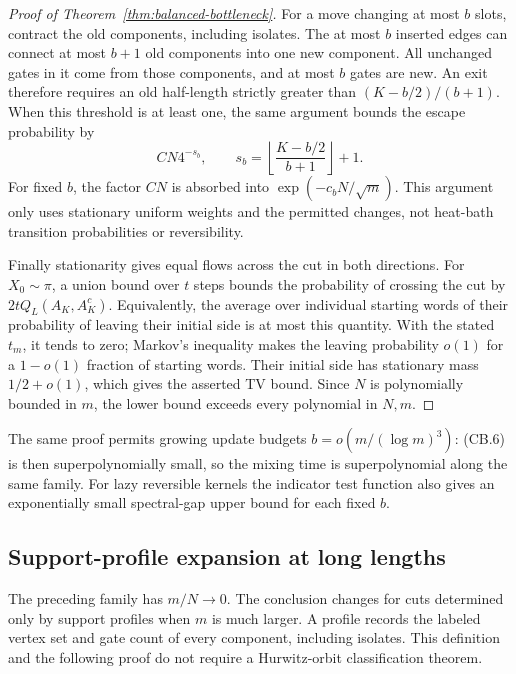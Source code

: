 \begin{proof}[Proof of Theorem~\ref{thm:balanced-bottleneck}]
For a move changing at most $b$ slots, contract the old components,
including isolates.  The at most $b$ inserted edges can connect at most
$b+1$ old components into one new component.  All unchanged gates in it
come from those components, and at most $b$ gates are new.  An exit
therefore requires an old half-length strictly greater than
$(K-b/2)/(b+1)$.  When this threshold is at least one, the same argument
bounds the escape probability by
\[
 C N4^{-s_b},\qquad
 s_b=\left\lfloor\frac{K-b/2}{b+1}\right\rfloor+1.    \tag{CB.6}
\]
For fixed $b$, the factor $CN$ is absorbed into $\exp(-c_bN/\sqrt m)$.
This argument only uses stationary uniform weights and the permitted
changes, not heat-bath transition probabilities or reversibility.

Finally stationarity gives equal flows across the cut in both directions.
For $X_0\sim\pi$, a union bound over $t$ steps bounds the probability
of crossing the cut by $2tQ_L(A_K,A_K^c)$.  Equivalently, the average over
individual starting words of their probability of leaving their initial
side is at most this quantity.  With the stated $t_m$, it tends to zero;
Markov's inequality makes the leaving probability $o(1)$ for a
$1-o(1)$ fraction of starting words.  Their initial side has stationary
mass $1/2+o(1)$, which gives the asserted TV bound.  Since $N$ is
polynomially bounded in $m$, the lower bound exceeds every polynomial in
$N,m$.
\end{proof}

The same proof permits growing update budgets
$b=o(m/(\log m)^3)$: (CB.6) is then superpolynomially small, so the
mixing time is superpolynomial along the same family.  For lazy reversible
kernels the indicator test function also gives an exponentially small
spectral-gap upper bound for each fixed $b$.

\subsection{Support-profile expansion at long lengths}

The preceding family has $m/N\to0$.  The conclusion changes for cuts
determined only by support profiles when $m$ is much larger.  A profile
records the labeled vertex set and gate count of every component,
including isolates.  This definition and the following proof do not
require a Hurwitz-orbit classification theorem.

